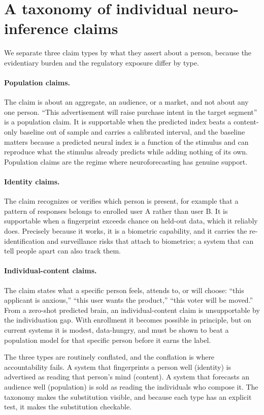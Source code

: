 \documentclass[sigconf,review,anonymous]{acmart}
\begin{document}
\section{A taxonomy of individual neuro-inference claims}
We separate three claim types by what they assert about a person, because the evidentiary burden and the
regulatory exposure differ by type.

\paragraph{Population claims.} The claim is about an aggregate, an audience, or a market, and not about any
one person. ``This advertisement will raise purchase intent in the target segment'' is a population claim. It
is supportable when the predicted index beats a content-only baseline out of sample and carries a calibrated
interval, and the baseline matters because a predicted neural index is a function of the stimulus and can
reproduce what the stimulus already predicts while adding nothing of its own. Population claims are the
regime where neuroforecasting has genuine support.

\paragraph{Identity claims.} The claim recognizes or verifies which person is present, for example that a
pattern of responses belongs to enrolled user A rather than user B. It is supportable when a fingerprint
exceeds chance on held-out data, which it reliably does. Precisely because it works, it is a biometric
capability, and it carries the re-identification and surveillance risks that attach to biometrics; a system
that can tell people apart can also track them.

\paragraph{Individual-content claims.} The claim states what a specific person feels, attends to, or will
choose: ``this applicant is anxious,'' ``this user wants the product,'' ``this voter will be moved.'' From a
zero-shot predicted brain, an individual-content claim is unsupportable by the individuation gap. With
enrollment it becomes possible in principle, but on current systems it is modest, data-hungry, and must be
shown to beat a population model for that specific person before it earns the label.

The three types are routinely conflated, and the conflation is where accountability fails. A system that
fingerprints a person well (identity) is advertised as reading that person's mind (content). A system that
forecasts an audience well (population) is sold as reading the individuals who compose it. The taxonomy makes
the substitution visible, and because each type has an explicit test, it makes the substitution checkable.
\end{document}
